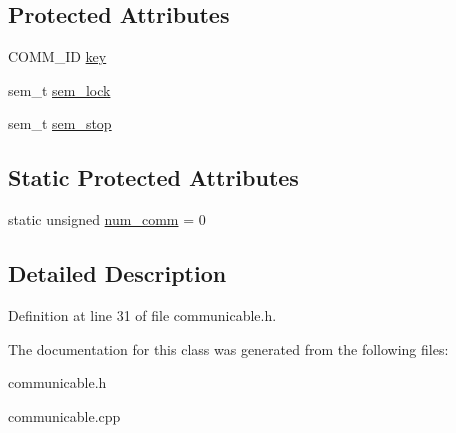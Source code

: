 \subsection*{Protected Attributes}
\begin{CompactItemize}
\item 
\hypertarget{classCommunicable_605b0efeffe81326f216c9903f5bbf4c}{
COMM\_\-ID \hyperlink{classCommunicable_605b0efeffe81326f216c9903f5bbf4c}{key}}
\label{classCommunicable_605b0efeffe81326f216c9903f5bbf4c}

\item 
\hypertarget{classCommunicable_cf9639312f71a2f348bc1e7789ccbd9d}{
sem\_\-t \hyperlink{classCommunicable_cf9639312f71a2f348bc1e7789ccbd9d}{sem\_\-lock}}
\label{classCommunicable_cf9639312f71a2f348bc1e7789ccbd9d}

\item 
\hypertarget{classCommunicable_29c53b9191348e0505e3bcba6d8b82b1}{
sem\_\-t \hyperlink{classCommunicable_29c53b9191348e0505e3bcba6d8b82b1}{sem\_\-stop}}
\label{classCommunicable_29c53b9191348e0505e3bcba6d8b82b1}

\end{CompactItemize}
\subsection*{Static Protected Attributes}
\begin{CompactItemize}
\item 
\hypertarget{classCommunicable_7a6acfdc781a67c9c0ec4f17893f86c3}{
static unsigned \hyperlink{classCommunicable_7a6acfdc781a67c9c0ec4f17893f86c3}{num\_\-comm} = 0}
\label{classCommunicable_7a6acfdc781a67c9c0ec4f17893f86c3}

\end{CompactItemize}


\subsection{Detailed Description}




Definition at line 31 of file communicable.h.

The documentation for this class was generated from the following files:\begin{CompactItemize}
\item 
communicable.h\item 
communicable.cpp\end{CompactItemize}
